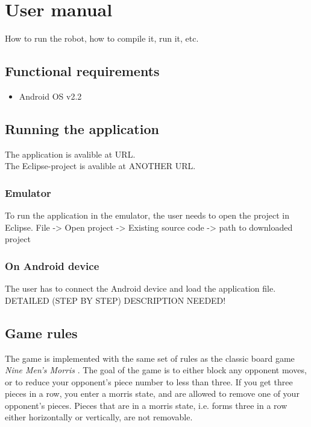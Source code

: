 \section{User manual}

How to run the robot, how to compile it, run it, etc.

\subsection{Functional requirements}

\begin{itemize}
\item Android OS v2.2
\end{itemize}

\subsection{Running the application}
The application is avalible at URL. \\
The Eclipse-project is avalible at ANOTHER URL.

\subsubsection{Emulator}
To run the application in the emulator, the user needs to open the project in Eclipse.
File -> Open project -> Existing source code -> path to downloaded project

\subsubsection{On Android device}
The user has to connect the Android device and load the application file. \\
DETAILED (STEP BY STEP) DESCRIPTION NEEDED!

\subsection{Game rules}

The game is implemented with the same set of rules as the classic board game \emph{Nine Men's Morris} \cite{morris}. The goal of the game is to either block any opponent moves, or to reduce your opponent's piece number to less than three. If you get three pieces in a row, you enter a morris state, and are allowed to remove one of your opponent's pieces. Pieces that are in a morris state, i.e. forms three in a row either horizontally or vertically, are not removable.

